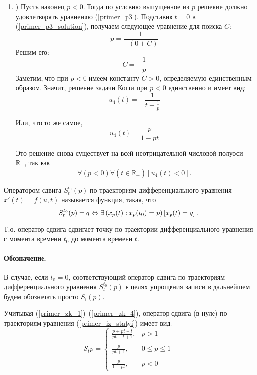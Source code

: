 \begin{enumerate}
\item)
Пусть наконец $p<0$.
Тогда по условию выпущенное из $p$ решение должно удовлетворять уравнению (\ref{primer_p3}).
Подставив $t=0$ в (\ref{primer_p3_solution}), получаем следующее уравнение для поиска $C$:
$$
	p=\frac{1}{-(0+C)}
$$
Решим его:
$$
	C=-\frac{1}{p}
$$
Заметим, что при $p<0$ имеем константу $C>0$, определяемую единственным образом.
Значит, решение задачи Коши при $p<0$ единственно и имеет вид:
\begin{equation}\label{primer_zk_4_0}
	u_4(t)=-\frac{1}{t-\frac{1}{p}}
\end{equation}

Или, что то же самое,
\begin{equation}\label{primer_zk_4}
	u_4(t)=\frac{p}{1-pt}
\end{equation}

Это решение снова существует на всей неотрицательной числовой полуоси $\mathbb{R}_+$, так как
$$
	\forall(p<0)\forall\left(t \in \mathbb{R}_+\right)\left[u_4(t) < 0\right].
$$

\end{enumerate}

\opred
Оператором сдвига $S^{t_0}_t (p)$ по траекториям дифференциального уравнения $x'(t) = f(u,t)$ называется функция, такая, что
\begin{equation*}
	S^{t_0}_t (p) = q \Leftrightarrow
		\exists\left(x_p(t) : x_p(t_0) = p\right)\left[x_p(t) = q\right].
\end{equation*}

Т.о. оператор сдвига сдвигает точку по траектории дифференциального уравнения с момента времени $t_0$ до момента времени $t$.

\paragraph{Обозначение.}
В случае, если $t_0=0$, соответствующий оператор сдвига по траекториям дифференциального уравнения $S^{t_0}_t (p)$ в целях упрощения записи  в дальнейшем будем обозначать просто $S_t (p)$.

Учитывая (\ref{primer_zk_1})--(\ref{primer_zk_4}), оператор сдвига (в нуле) по траекториям уравнения (\ref{primer_iz_statyi}) имеет вид:
\begin{equation}\label{oper_sdviga_primer_1}
	S_t p =
	\left\{
		\begin{array}{ll}
			\frac{p+pt-t}{pt-t+1}, & p > 1
		\\\\
			\frac{p}{pt+1},        & 0 \leq p \leq 1
		\\\\
			\frac{p}{1 - pt},      & p < 0
		\end{array}
	\right.
\end{equation}



